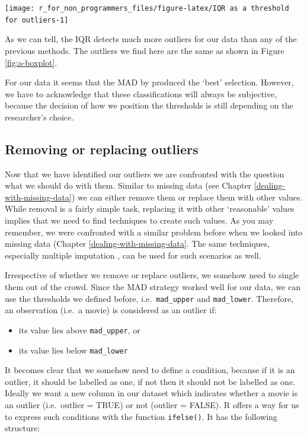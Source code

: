 \documentclass[
]{book}
\begin{document}
\begin{center}\texttt{[image: r\_for\_non\_programmers\_files/figure-latex/IQR as a threshold for outliers-1]} \end{center}

As we can tell, the IQR detects much more outliers for our data than any of the previous methods. The outliers we find here are the same as shown in Figure \ref{fig:a-boxplot}.

For our data it seems that the MAD by \citet{leys2013detecting} produced the `best' selection. However, we have to acknowledge that these classifications will always be subjective, because the decision of how we position the thresholds is still depending on the researcher's choice.

\hypertarget{removing-or-replacing-outliers}{%
\subsection{Removing or replacing outliers}\label{removing-or-replacing-outliers}}

Now that we have identified our outliers we are confronted with the question what we should do with them. Similar to missing data (see Chapter \ref{dealing-with-missing-data}) we can either remove them or replace them with other values. While removal is a fairly simple task, replacing it with other `reasonable' values implies that we need to find techniques to create such values. As you may remember, we were confronted with a similar problem before when we looked into missing data (Chapter \ref{dealing-with-missing-data}. The same techniques, especially multiple imputation \citep[see][]{cousineau2010outliers}, can be used for such scenarios as well.

Irrespective of whether we remove or replace outliers, we somehow need to single them out of the crowd. Since the MAD strategy worked well for our data, we can use the thresholds we defined before, i.e.~\texttt{mad\_upper} and \texttt{mad\_lower}. Therefore, an observation (i.e.~a movie) is considered as an outlier if:

\begin{itemize}
\item
  its value lies above \texttt{mad\_upper}, or
\item
  its value lies below \texttt{mad\_lower}
\end{itemize}

It becomes clear that we somehow need to define a condition, because if it is an outlier, it should be labelled as one, if not then it should not be labelled as one. Ideally we want a new column in our dataset which indicates whether a movie is an outlier (i.e.~outlier = TRUE) or not (outlier = FALSE). R offers a way for us to express such conditions with the function \texttt{ifelse()}. It has the following structure:
\end{document}
